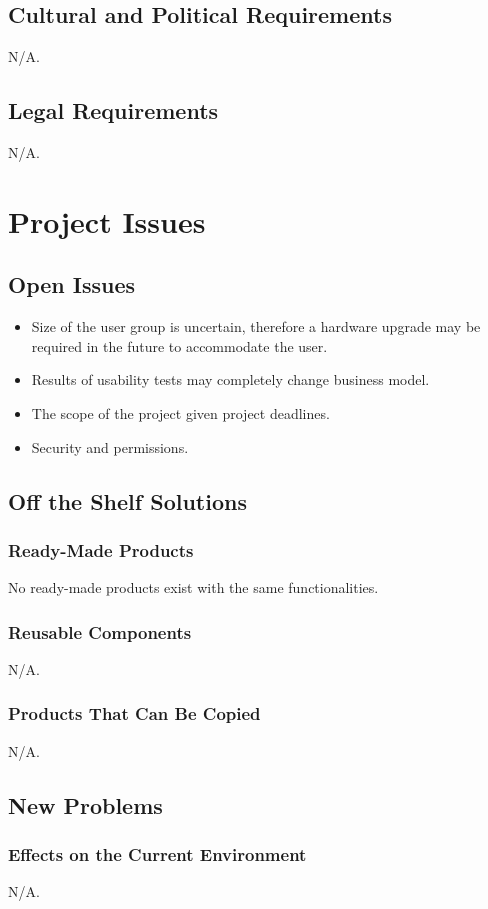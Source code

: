 \documentclass[12pt]{article}
\begin{document}
{\subsection{Cultural and Political Requirements}
N/A.
\subsection{Legal Requirements}
N/A.

\section{Project Issues}
\subsection{Open Issues}
\begin{itemize}
  \item Size of the user group is uncertain, therefore a hardware upgrade may be 
required in the future to accommodate the user.
  \item Results of usability tests may completely change business model.
  \item The scope of the project given project deadlines.
  \item Security and permissions.
\end{itemize}

\subsection{Off the Shelf Solutions}
\subsubsection{Ready-Made Products}
No ready-made products exist with the same functionalities. 
\subsubsection{Reusable Components}
N/A.
\subsubsection{Products That Can Be Copied}
N/A.
\subsection{New Problems}
\subsubsection{Effects on the Current Environment}
N/A.
}
\end{document}
